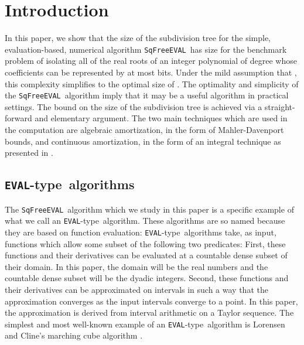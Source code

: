 \documentclass{amsart}
\theoremstyle{definition}
\newcommand{\EVAL}{\texttt{SqFreeEVAL}}
\newcommand{\EVALTYPE}{\texttt{EVAL}-type}
\begin{document}
\section{Introduction}
In this paper, we show that the size of the subdivision tree for the simple, evaluation-based, numerical algorithm \EVAL\ has size  for the benchmark problem of isolating all of the real roots of an integer polynomial of degree  whose coefficients can be represented by at most  bits.  Under the mild assumption that , this complexity simplifies to the optimal size of .  The optimality and simplicity of the \EVAL\ algorithm imply that it may be a useful algorithm in practical settings.  The bound on the size of the subdivision tree is achieved via a straight-forward and elementary argument.  The two main techniques which are used in the computation are algebraic amortization, in the form of Mahler-Davenport bounds, and continuous amortization, in the form of an integral technique as presented in \citep{Burr-Krahmer-Yap:integral:09}.

\subsection{\EVALTYPE\ algorithms}
The \EVAL\ algorithm which we study in this paper is a specific example of what we call an \EVALTYPE\ algorithm.  These algorithms are so named because they are based on function evaluation: \EVALTYPE\ algorithms take, as input, functions which allow some subset of the following two predicates: First, these functions and their derivatives can be evaluated at a countable dense subset of their domain.  In this paper, the domain will be the real numbers and the countable dense subset will be the dyadic integers.  Second, these functions and their derivatives can be approximated on intervals in such a way that the approximation converges as the input intervals converge to a point.  In this paper, the approximation is derived from interval arithmetic on a Taylor sequence.  The simplest and most well-known example of an \EVALTYPE\ algorithm is Lorensen and Cline's marching cube algorithm \citep{marchingcube1987}.
\end{document}
